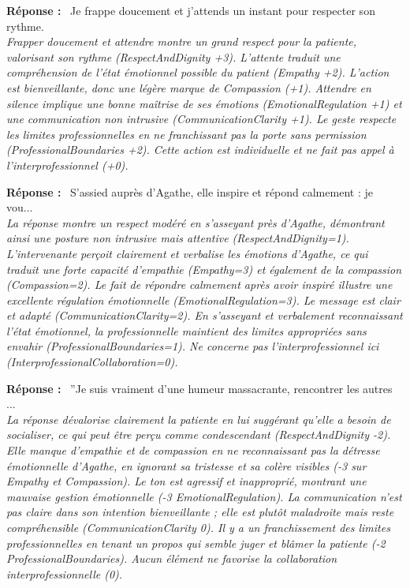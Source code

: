 \noindent\textbf{R\'eponse :} \guillemotleft\ Je frappe doucement et j'attends un instant pour respecter son rythme.\ \guillemotright{}\\
\textit{Frapper doucement et attendre montre un grand respect pour la patiente, valorisant son rythme (RespectAndDignity +3). L'attente traduit une compréhension de l'état émotionnel possible du patient (Empathy +2). L'action est bienveillante, donc une légère marque de Compassion (+1). Attendre en silence implique une bonne maîtrise de ses émotions (EmotionalRegulation +1) et une communication non intrusive (CommunicationClarity +1). Le geste respecte les limites professionnelles en ne franchissant pas la porte sans permission (ProfessionalBoundaries +2). Cette action est individuelle et ne fait pas appel à l'interprofessionnel (+0).}
\vspace{3mm}

\noindent\textbf{R\'eponse :} \guillemotleft\ S'assied auprès d'Agathe, elle inspire et répond calmement : je vou...\ \guillemotright{}\\
\textit{La réponse montre un respect modéré en s'asseyant près d'Agathe, démontrant ainsi une posture non intrusive mais attentive (RespectAndDignity=1). L'intervenante perçoit clairement et verbalise les émotions d'Agathe, ce qui traduit une forte capacité d'empathie (Empathy=3) et également de la compassion (Compassion=2). Le fait de répondre calmement après avoir inspiré illustre une excellente régulation émotionnelle (EmotionalRegulation=3). Le message est clair et adapté (CommunicationClarity=2). En s'asseyant et verbalement reconnaissant l'état émotionnel, la professionnelle maintient des limites appropriées sans envahir (ProfessionalBoundaries=1). Ne concerne pas l'interprofessionnel ici (InterprofessionalCollaboration=0).}
\vspace{3mm}

\noindent\textbf{R\'eponse :} \guillemotleft\ ''Je suis vraiment d'une humeur massacrante, rencontrer les autres ...\ \guillemotright{}\\
\textit{La réponse dévalorise clairement la patiente en lui suggérant qu'elle a besoin de socialiser, ce qui peut être perçu comme condescendant (RespectAndDignity -2). Elle manque d'empathie et de compassion en ne reconnaissant pas la détresse émotionnelle d'Agathe, en ignorant sa tristesse et sa colère visibles (-3 sur Empathy et Compassion). Le ton est agressif et inapproprié, montrant une mauvaise gestion émotionnelle (-3 EmotionalRegulation). La communication n'est pas claire dans son intention bienveillante ; elle est plutôt maladroite mais reste compréhensible (CommunicationClarity 0). Il y a un franchissement des limites professionnelles en tenant un propos qui semble juger et blâmer la patiente (-2 ProfessionalBoundaries). Aucun élément ne favorise la collaboration interprofessionnelle (0).}
\vspace{3mm}



